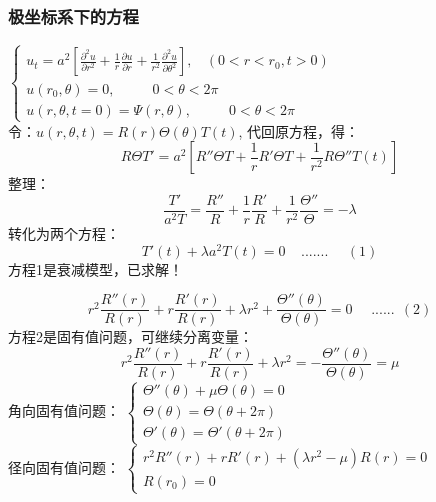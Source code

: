 \begin{frame}
	\frametitle{极坐标系下的方程}
	$\begin{cases}
		\displaystyle	u_t=a^2 [ {	\frac{\partial^2 u }{\partial r^2 } +\frac{1}{r } \frac{\partial u }{\partial r } +
		\frac{1}{r^2 } \frac{\partial ^2 u }{\partial \theta ^2
		} }], ~~~~ (0<r<r_0, t>0)\\
		u(r_0,\theta)=0,~~~~~~~~~~~~ 0<\theta <2\pi 	\\
		u(r,\theta,t =0)=\Psi(r,\theta) ,~~~~~~~~~~~~ 0<\theta <2\pi 	
	\end{cases} $\\
	令：$u(r,\theta,t) =R(r)\Theta(\theta)T(t)$,  代回原方程，得：
	\begin{equation*}
		R\Theta T'=a^2 [ R'' \Theta T + \dfrac{1}{r} R' \Theta T  + \dfrac{1}{r^2} R \Theta '' T(t)  ]
	\end{equation*}
	整理：
	\begin{equation*}
		\frac{T'}{a^2T} =\frac{R''}{R}+\frac{1}{r} \frac{R'}{R} +\frac{1}{r^2} \frac{\Theta ''} {\Theta}  =-\lambda
	\end{equation*}
	转化为两个方程：
	\begin{equation*}
		T'(t)+\lambda a^2T(t)=0  ~~~~~....... ~~~~~~(1)
	\end{equation*}	
	方程1是衰减模型，已求解！\\
\end{frame}	

\begin{frame}
	\begin{equation*}
		r^2 \frac{R'' (r)}{R(r)}+r \frac{R'(r)}{R(r)} + \lambda r^2 +\frac{\Theta ''(\theta)} {\Theta (\theta)} =0  ~~~~~~......~~(2)
	\end{equation*}
	方程2是固有值问题，可继续分离变量：	
	\begin{equation*}
		r^2 \frac{R'' (r)}{R(r)}+r \frac{R'(r)}{R(r)} + \lambda r^2 =-\frac{\Theta ''(\theta)} {\Theta (\theta)} =\mu  
	\end{equation*}
	角向固有值问题：
	$ \begin{cases}
		\Theta ''(\theta)+\mu \Theta (\theta) =0 \\
		\Theta (\theta) =	\Theta (\theta+2\pi)  \\
		\Theta' (\theta) =	\Theta' (\theta+2\pi)  
	\end{cases} $\\	
	径向固有值问题：
	$ \begin{cases}
		r^2 R'' (r)+r R'(r) +( \lambda r^2 -\mu)R(r)=0  \\
		R(r_0)=0
	\end{cases} $\\	
\end{frame}	

